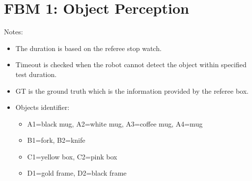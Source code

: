 \section*{FBM 1: Object Perception}


\noindent Notes:
\begin{itemize}
\item The duration is based on the referee stop watch.
\item Timeout is checked when the robot cannot detect the object within specified test duration.
\item GT is the ground truth which is the information provided by the referee box.
\item Objects identifier:
	\begin{itemize}
		\item A1=black mug, A2=white mug, A3=coffee mug, A4=mug
		\item B1=fork, B2=knife
		\item C1=yellow box, C2=pink box
		\item D1=gold frame, D2=black frame
	\end{itemize}
\end{itemize}

\vspace{0.5cm}


\newpage
{}\\
\\
\\

\newpage
{}\\
\\
\\

\newpage
{}\\
\\



